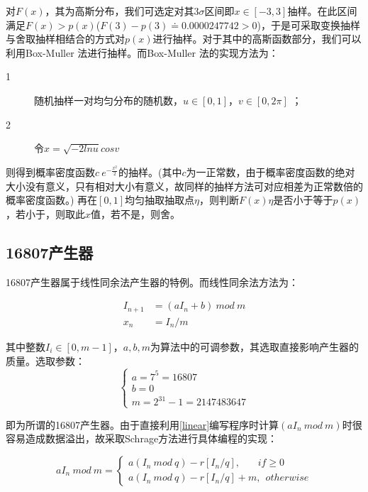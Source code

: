 \documentclass[a4paper,11pt]{article}
\begin{document}
对$F(x)$，其为高斯分布，我们可选定对其$3\sigma$区间即$x \in [-3,3]$抽样。在此区间满足$F(x)>p(x)$($F(3)-p(3)\doteq 0.0000247742 > 0$)，于是可采取变换抽样与舍取抽样相结合的方式对$p(x)$进行抽样。对于其中的高斯函数部分，我们可以利用Box-Muller 法进行抽样。而Box-Muller 法的实现方法为：
\begin{description} 
\item[1] 随机抽样一对均匀分布的随机数，$ u  \in [ 0,1 ]，v \in [0,2\pi]$ ；
\item[2] 令$x=\sqrt{-2lnu}cosv$
\end{description}

则得到概率密度函数$c~e^{-\frac{x^{2}}{2}}$的抽样。(其中$c$为一正常数，由于概率密度函数的绝对大小没有意义，只有相对大小有意义，故同样的抽样方法可对应相差为正常数倍的概率密度函数。)
再在$[0,1]$均匀抽取抽取点$\eta$，则判断$F(x)\eta$是否小于等于$p(x)$，若小于，则取此$x$值，若不是，则舍。


\subsection{16807产生器}
16807产生器属于线性同余法产生器的特例。而线性同余法方法为：

\begin{equation}
\begin{aligned}
	I_{n+1} &= (aI_{n} + b) \ mod \ m \\
	x_{n} &= I_{n}/m
\end{aligned}
\label{linear}	
\end{equation}

其中整数$I_{i} \in [0,m-1]$，$a,b,m$为算法中的可调参数，其选取直接影响产生器的质量。选取参数：
\begin{equation}
\left\{
\begin{array}{l}
	a = 7^{5} = 16807 \\
	b = 0 \\
	m = 2^{31}-1 = 2147483647
\end{array}
\right.
\end{equation}

即为所谓的16807产生器。由于直接利用\ref{linear}编写程序时计算$(aI_{n} \ mod \ m )$时很容易造成数据溢出，故采取Schrage方法进行具体编程的实现：

\begin{equation}
	aI_{n} \ mod \ m = \left\{
	\begin{array}{l}
		a(I_{n}\ mod \ q) - r[I_{n}/q],\ \ \ \ \ \ \ \ if \geq 0 \\
		a(I_{n}\ mod \ q) - r[I_{n}/q] + m,\ \ otherwise	
			\end{array}
	\right.
\end{equation}
\end{document}
